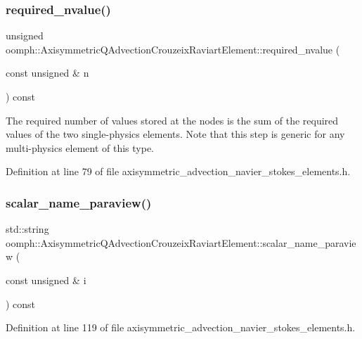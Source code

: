 \subsubsection{\texorpdfstring{required\+\_\+nvalue()}{required\_nvalue()}}
{\footnotesize\ttfamily unsigned oomph\+::\+Axisymmetric\+Q\+Advection\+Crouzeix\+Raviart\+Element\+::required\+\_\+nvalue (\begin{DoxyParamCaption}\item[{const unsigned \&}]{n }\end{DoxyParamCaption}) const\hspace{0.3cm}{\ttfamily [inline]}}



The required number of values stored at the nodes is the sum of the required values of the two single-\/physics elements. Note that this step is generic for any multi-\/physics element of this type. 



Definition at line 79 of file axisymmetric\+\_\+advection\+\_\+navier\+\_\+stokes\+\_\+elements.\+h.

\mbox{\label{classoomph_1_1AxisymmetricQAdvectionCrouzeixRaviartElement_adbdaca9b4a33c99be092098e5aabce45}} 
\subsubsection{\texorpdfstring{scalar\+\_\+name\+\_\+paraview()}{scalar\_name\_paraview()}}
{\footnotesize\ttfamily std\+::string oomph\+::\+Axisymmetric\+Q\+Advection\+Crouzeix\+Raviart\+Element\+::scalar\+\_\+name\+\_\+paraview (\begin{DoxyParamCaption}\item[{const unsigned \&}]{i }\end{DoxyParamCaption}) const\hspace{0.3cm}{\ttfamily [inline]}}



Definition at line 119 of file axisymmetric\+\_\+advection\+\_\+navier\+\_\+stokes\+\_\+elements.\+h.

